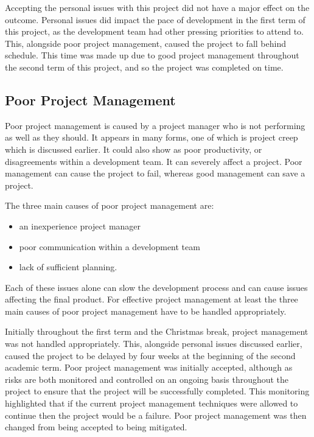 \documentclass{article}
\begin{document}
Accepting the personal issues with this project did not have a major effect on the outcome. Personal issues did impact the pace of development in the first term of this project, as the development team had other pressing priorities to attend to. This, alongside poor project management, caused the project to fall behind schedule. This time was made up due to good project management throughout the second term of this project, and so the project was completed on time. \par

\subsection{Poor Project Management}

Poor project management is caused by a project manager who is not performing as well as they should. It appears in many forms, one of which is project creep which is discussed earlier. It could also show as poor productivity, or disagreements within a development team. It can severely affect a project. Poor management can cause the project to fail, whereas good management can save a project. \par

The three main causes of poor project management are:

\begin{itemize}
	\item an inexperience project manager
	\item poor communication within a development team
	\item lack of sufficient planning.
\end{itemize}

Each of these issues alone can slow the development process and can cause issues affecting the final product. For effective project management at least the three main causes of poor project management have to be handled appropriately. \par

Initially throughout the first term and the Christmas break, project management was not handled appropriately. This, alongside personal issues discussed earlier, caused the project to be delayed by four weeks at the beginning of the second academic term. Poor project management was initially accepted, although as risks are both monitored and controlled on an ongoing basis throughout the project to ensure that the project will be successfully completed. This monitoring highlighted that if the current project management techniques were allowed to continue then the project would be a failure. Poor project management was then changed from being accepted to being mitigated. \par
\end{document}
